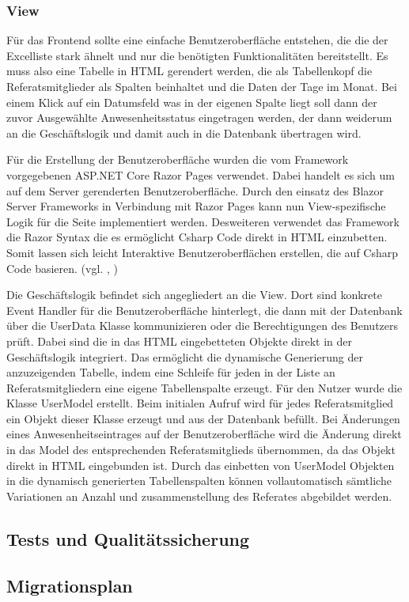 \subsubsection{View}
\label{sec:View}
Für das Frontend sollte eine einfache Benutzeroberfläche entstehen, die die der Excelliste stark ähnelt und nur die benötigten Funktionalitäten bereitstellt. Es muss also eine Tabelle in HTML gerendert werden, die als Tabellenkopf die Referatsmitglieder als Spalten beinhaltet und die Daten der Tage im Monat. Bei einem Klick auf ein Datumsfeld was in der eigenen Spalte liegt soll dann der zuvor Ausgewählte Anwesenheitsstatus eingetragen werden, der dann weiderum an die Geschäftslogik und damit auch in die Datenbank übertragen wird.

Für die Erstellung der Benutzeroberfläche wurden die vom Framework vorgegebenen ASP.NET Core Razor Pages verwendet. Dabei handelt es sich um auf dem Server gerenderten Benutzeroberfläche. Durch den einsatz des Blazor Server Frameworks in Verbindung mit Razor Pages kann nun View-spezifische Logik für die Seite implementiert werden. Desweiteren verwendet das Framework die Razor Syntax die es ermöglicht Csharp Code direkt in HTML einzubetten. Somit lassen sich leicht Interaktive Benutzeroberflächen erstellen, die auf Csharp Code basieren. (vgl. \cite{Razor}, \cite{RazorSyntax})

Die Geschäftslogik befindet sich angegliedert an die View. Dort sind konkrete Event Handler für die Benutzeroberfläche hinterlegt, die dann \zB mit der Datenbank über die UserData Klasse kommunizieren oder die Berechtigungen des Benutzers prüft. Dabei sind die in das HTML eingebetteten Objekte direkt in der Geschäftslogik integriert. Das ermöglicht die dynamische Generierung der anzuzeigenden Tabelle, indem eine Schleife für jeden in der Liste an Referatsmitgliedern eine eigene Tabellenspalte erzeugt. Für den Nutzer wurde die Klasse UserModel erstellt. Beim initialen Aufruf wird für jedes Referatsmitglied ein Objekt dieser Klasse erzeugt und aus der Datenbank befüllt. Bei Änderungen eines Anwesenheitseintrages auf der Benutzeroberfläche wird die Änderung direkt in das Model des entsprechenden Referatsmitglieds übernommen, da das Objekt direkt in HTML eingebunden ist. Durch das einbetten von UserModel Objekten in die dynamisch generierten Tabellenspalten können vollautomatisch sämtliche Variationen an Anzahl und zusammenstellung des Referates abgebildet werden. %


\subsection{Tests und Qualitätssicherung}
\label{sec:Tests}

\subsection{Migrationsplan}
\label{sec:Migrationsplan}